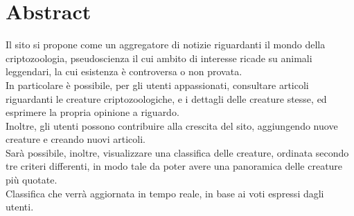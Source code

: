 \section{Abstract}
\label{sec:abstract}
Il sito si propone come un aggregatore di notizie riguardanti il mondo della criptozoologia, pseudoscienza il cui ambito di interesse ricade su animali leggendari, la cui esistenza è controversa o non provata. \\
In particolare è possibile, per gli utenti appassionati, consultare articoli riguardanti le creature criptozoologiche, e i dettagli delle creature stesse, ed esprimere la propria opinione a riguardo. \\
Inoltre, gli utenti possono contribuire alla crescita del sito, aggiungendo nuove creature e creando nuovi articoli. \\
Sarà possibile, inoltre, visualizzare una classifica delle creature, ordinata secondo tre criteri differenti, in modo tale da poter avere una panoramica delle creature più quotate. \\
Classifica che verrà aggiornata in tempo reale, in base ai voti espressi dagli utenti.